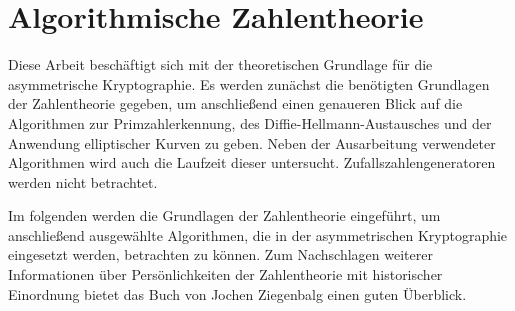 \chapter*{Algorithmische Zahlentheorie}\label{Algorithmische Zahlentheorie}
	Diese Arbeit beschäftigt sich mit der theoretischen Grundlage für die asymmetrische Kryptographie. Es werden zunächst die benötigten Grundlagen der Zahlentheorie gegeben, um anschließend einen genaueren Blick auf die Algorithmen zur Primzahlerkennung, des Diffie-Hellmann-Austausches und der Anwendung elliptischer Kurven zu geben. Neben der Ausarbeitung verwendeter Algorithmen wird auch die Laufzeit dieser untersucht. Zufallszahlengeneratoren werden nicht betrachtet.
		
	\wupp Im folgenden werden die Grundlagen der Zahlentheorie eingeführt, um anschließend ausgewählte Algorithmen, die in der asymmetrischen Kryptographie eingesetzt werden, betrachten zu können. Zum Nachschlagen weiterer Informationen über Persönlichkeiten der Zahlentheorie mit historischer Einordnung bietet das Buch \cite{Elementare:Zahlentheorie} von Jochen Ziegenbalg einen guten Überblick.